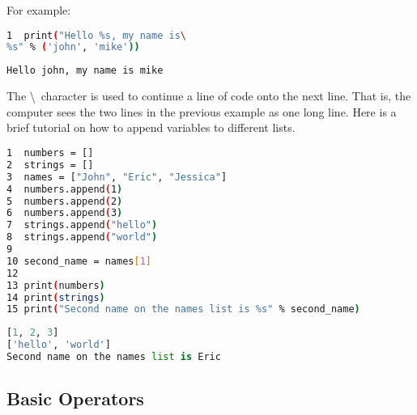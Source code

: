\documentclass[crop=false,class=book]{standalone}
\begin{document}
For example:\newline
\begin{minipage}[t]{.48\textwidth}
\centering
\begin{lstlisting}[language=bash,basicstyle=\small\ttfamily,frame=single,caption=input]
1  print("Hello %s, my name is\
%s" % ('john', 'mike'))
\end{lstlisting}
\end{minipage}\hfill
\begin{minipage}[t]{.48\textwidth}
\centering
\begin{lstlisting}[language=bash,basicstyle=\small\ttfamily,frame=single,caption=output]
Hello john, my name is mike
\end{lstlisting}
\end{minipage}\newline
The \textbackslash\ character is used to continue a line of code onto the next line. That is, the computer sees the two lines in the previous example as one long line. Here is a brief tutorial on how to append variables to different lists.
\begin{lstlisting}[language=bash,basicstyle=\small\ttfamily,frame=single,caption=input]
1  numbers = []
2  strings = []
3  names = ["John", "Eric", "Jessica"]
4  numbers.append(1)
5  numbers.append(2)
6  numbers.append(3)
7  strings.append("hello")
8  strings.append("world")
9
10 second_name = names[1]
12
13 print(numbers)
14 print(strings)
15 print("Second name on the names list is %s" % second_name)
\end{lstlisting}
\begin{lstlisting}[language=python,frame=single,basicstyle=\footnotesize,frame=single,caption=output]
[1, 2, 3]
['hello', 'world']
Second name on the names list is Eric
\end{lstlisting}
\subsection{Basic Operators}
\end{document}
